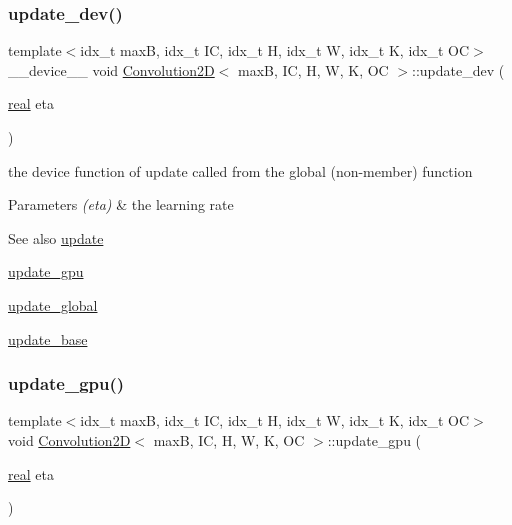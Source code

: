 \subsubsection{\texorpdfstring{update\+\_\+dev()}{update\_dev()}}
{\footnotesize\ttfamily template$<$idx\+\_\+t maxB, idx\+\_\+t IC, idx\+\_\+t H, idx\+\_\+t W, idx\+\_\+t K, idx\+\_\+t OC$>$ \\
\+\_\+\+\_\+device\+\_\+\+\_\+ void \hyperlink{structConvolution2D}{Convolution2D}$<$ maxB, IC, H, W, K, OC $>$\+::update\+\_\+dev (\begin{DoxyParamCaption}\item[{\hyperlink{vgg__util_8h_a1082d08aaa761215ec83e7149f27ad16}{real}}]{eta }\end{DoxyParamCaption})\hspace{0.3cm}{\ttfamily [inline]}}



the device function of update called from the global (non-\/member) function 


\begin{DoxyParams}{Parameters}
{\em (eta)} & the learning rate \\
\hline
\end{DoxyParams}
\begin{DoxySeeAlso}{See also}
\hyperlink{structConvolution2D_ac9fd666f96904bb7f62dc39cebae7a25}{update} 

\hyperlink{structConvolution2D_af189fb21ba3ecb6b9f7553c414f35446}{update\+\_\+gpu} 

\hyperlink{linear_8h_a810703be28422bb9483665cbdbafd968}{update\+\_\+global} 

\hyperlink{structConvolution2D_a5134826f56423c7629434f4c9ea40a1f}{update\+\_\+base} 
\end{DoxySeeAlso}
\mbox{\label{structConvolution2D_af189fb21ba3ecb6b9f7553c414f35446}} 
\subsubsection{\texorpdfstring{update\+\_\+gpu()}{update\_gpu()}}
{\footnotesize\ttfamily template$<$idx\+\_\+t maxB, idx\+\_\+t IC, idx\+\_\+t H, idx\+\_\+t W, idx\+\_\+t K, idx\+\_\+t OC$>$ \\
void \hyperlink{structConvolution2D}{Convolution2D}$<$ maxB, IC, H, W, K, OC $>$\+::update\+\_\+gpu (\begin{DoxyParamCaption}\item[{\hyperlink{vgg__util_8h_a1082d08aaa761215ec83e7149f27ad16}{real}}]{eta }\end{DoxyParamCaption})\hspace{0.3cm}{\ttfamily [inline]}}



